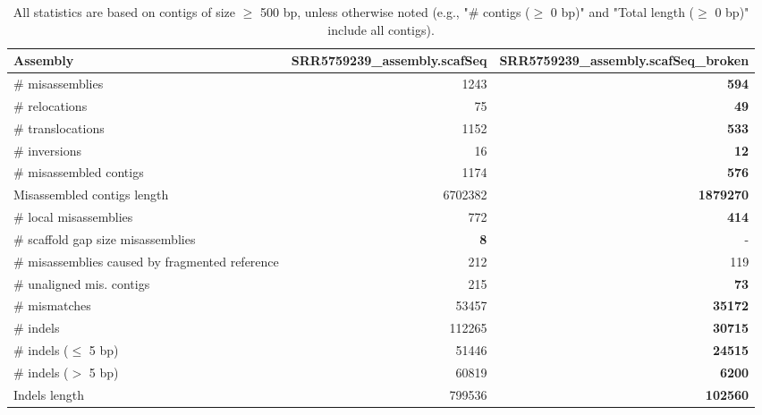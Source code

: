 \documentclass[12pt,a4paper]{article}
\begin{document}
\begin{table}[ht]
\begin{center}
\caption{All statistics are based on contigs of size $\geq$ 500 bp, unless otherwise noted (e.g., "\# contigs ($\geq$ 0 bp)" and "Total length ($\geq$ 0 bp)" include all contigs).}
\begin{tabular}{|l*{2}{|r}|}
\hline
Assembly & SRR5759239\_assembly.scafSeq & SRR5759239\_assembly.scafSeq\_broken \\ \hline
\# misassemblies & 1243 & {\bf 594} \\ \hline
\hspace{5mm}\# relocations & 75 & {\bf 49} \\ \hline
\hspace{5mm}\# translocations & 1152 & {\bf 533} \\ \hline
\hspace{5mm}\# inversions & 16 & {\bf 12} \\ \hline
\# misassembled contigs & 1174 & {\bf 576} \\ \hline
Misassembled contigs length & 6702382 & {\bf 1879270} \\ \hline
\# local misassemblies & 772 & {\bf 414} \\ \hline
\# scaffold gap size misassemblies & {\bf 8} & - \\ \hline
\# misassemblies caused by fragmented reference & 212 & 119 \\ \hline
\# unaligned mis. contigs & 215 & {\bf 73} \\ \hline
\# mismatches & 53457 & {\bf 35172} \\ \hline
\# indels & 112265 & {\bf 30715} \\ \hline
\hspace{5mm}\# indels ($\leq$ 5 bp) & 51446 & {\bf 24515} \\ \hline
\hspace{5mm}\# indels ($>$ 5 bp) & 60819 & {\bf 6200} \\ \hline
Indels length & 799536 & {\bf 102560} \\ \hline
\end{tabular}
\end{center}
\end{table}
\end{document}
